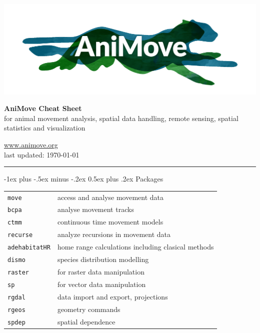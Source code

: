 \documentclass[a4paper,10pt,landscape]{article}
\makeatletter
\renewcommand{\section}{\@startsection{section}{1}{0mm}%
                                {-1ex plus -.5ex minus -.2ex}%
                                {0.5ex plus .2ex}%
                                {\normalfont\large\bfseries}}
\makeatother
\begin{document}
\newlength{\MyLen}


\raggedright
\footnotesize
\begin{multicols}{3}


\setlength{\premulticols}{1pt}
\setlength{\postmulticols}{1pt}
\setlength{\multicolsep}{1pt}
\setlength{\columnsep}{2pt}
  
\begin{center}
	 \includegraphics[width=.2\textwidth]{pics/animove_logo.png}
     
     \Large{\textbf{AniMove Cheat Sheet}} \\
     for animal movement analysis, spatial data handling, remote sensing, spatial statistics and visualization
     
\end{center}



\url{www.animove.org}\\
last updated: \today

\rule{0.32\textwidth}{0.4pt}


\section{Packages}
\begin{tabular}{@{}p{\the\MyLen}%
		@{}p{\linewidth-\the\MyLen}@{}}
\verb!move!  & access and analyse movement data\\
\verb!bcpa!  & analyse movement tracks\\
\verb!ctmm!  &  continuous time movement models\\
\verb!recurse!  & analyze recursions in movement data\\
\verb!adehabitatHR! & home range calculations including clasical methods\\
\verb!dismo!  &  species distribution modelling \\
\verb!raster!    & for raster data manipulation \\
\verb!sp!     & for vector data manipulation \\
\verb!rgdal!  & data import and export, projections \\
\verb!rgeos!  & geometry commands \\
\verb!spdep!  & spatial dependence \\


\end{tabular}
\end{multicols}
\end{document}
